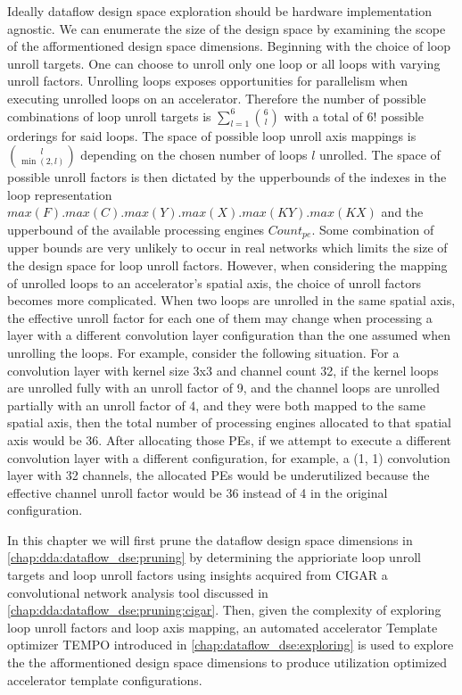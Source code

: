Ideally dataflow design space exploration should be hardware implementation
agnostic. We can enumerate the size of the design space by examining the scope
of the afformentioned design space dimensions. Beginning with the choice of loop
unroll targets. One can choose to unroll only one loop or all loops with
varying unroll factors. Unrolling loops exposes opportunities for parallelism
when executing unrolled loops on an accelerator. Therefore the number of
possible combinations of loop unroll targets is
$\sum\limits_{l=1}^{6}\binom{6}{l}$ with a total of $6!$ possible orderings for
said loops. The space of possible loop unroll axis mappings is $\binom{l}{\min(2,
l)}$ depending on the chosen number of loops $l$ unrolled. The space of possible
unroll factors is then dictated by the upperbounds of the indexes in the loop
representation $max(F).max(C).max(Y).max(X).max(KY).max(KX)$ and the upperbound
of the available processing engines $Count_{pe}$. Some combination of upper
bounds are very unlikely to occur in real networks which limits the size of the
design space for loop unroll factors. However, when considering the
mapping of unrolled loops to an accelerator's spatial axis, the choice of unroll
factors becomes more complicated. When two loops are unrolled in the same
spatial axis, the effective unroll factor for each one of them may change when
processing a layer with a different convolution layer configuration than the one
assumed when unrolling the loops. For example, consider the following situation.
For a convolution layer with kernel size 3x3 and channel count 32, if the kernel
loops are unrolled fully with an unroll factor of 9, and the channel loops are
unrolled partially with an unroll factor of 4, and they were both mapped to the
same spatial axis, then the total number of processing engines allocated to that
spatial axis would be 36. After allocating those PEs, if we attempt to execute a
different convolution layer with a different configuration, for example, a (1, 1)
convolution layer with 32 channels, the allocated PEs would be underutilized because
the effective channel unroll factor would be 36 instead of 4 in the original
configuration.

In this chapter we will first prune the dataflow design space dimensions in
\autoref{chap:dda:dataflow_dse:pruning} by determining the apprioriate
loop unroll targets and loop unroll factors using insights acquired from
\ac{CIGAR} a convolutional network analysis tool discussed in
\autoref{chap:dda:dataflow_dse:pruning:cigar}. Then, given the complexity of
exploring loop unroll factors and loop axis mapping, an automated accelerator
Template optimizer TEMPO introduced in \autoref{chap:dataflow_dse:exploring} is
used to explore the the afformentioned design space dimensions to produce
utilization optimized accelerator template configurations. 

